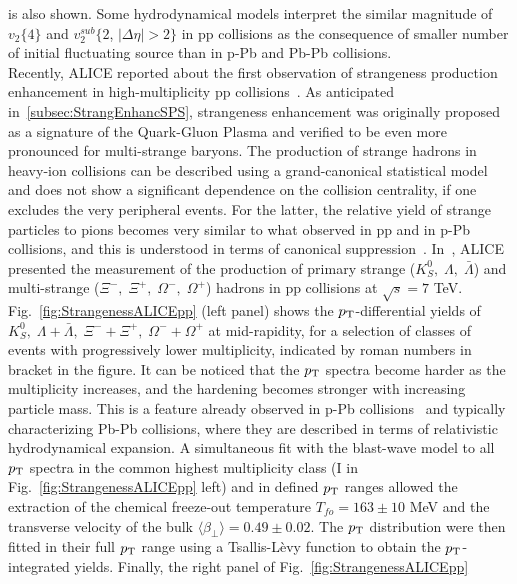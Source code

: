 is also shown. Some hydrodynamical models interpret the similar magnitude 
of $v_2 \{4\}$ and $v_2^{sub} \{2$, $|\Delta \eta| > 2\}$ in pp collisions as the 
consequence of smaller number of initial fluctuating source than in p-Pb and 
Pb-Pb collisions.\\
Recently, ALICE reported about the first observation of strangeness production
 enhancement in high-multiplicity pp collisions~\cite{ALICE:2017jyt}. As 
 anticipated in~\ref{subsec:StrangEnhancSPS}, strangeness enhancement 
 was originally proposed as a signature of the Quark-Gluon Plasma and 
 verified to be even more pronounced for multi-strange baryons. The production 
 of strange hadrons in heavy-ion collisions can be described using a 
 grand-canonical statistical model and does not show a significant dependence 
 on the collision centrality, if one excludes the very peripheral events. For the latter,
  the relative yield of strange particles to pions becomes very similar to what 
  observed in pp and in p-Pb~\cite{Abelev:2013haa,Adam:2015vsf} collisions, and this is understood
  in terms of canonical suppression~\cite{Tounsi:2001ck}. In~\cite{ALICE:2017jyt}, ALICE presented the
   measurement of the production of primary strange ($K^0_S,\; \Lambda,\; \bar{\Lambda}$) 
   and multi-strange ($\Xi^-,\; \Xi^+,\; \Omega^-,\; \Omega^+$) hadrons in pp 
   collisions at $\sqrt{s} = 7$ TeV. Fig.~\ref{fig:StrangenessALICEpp} (left panel) 
   shows the $p_{\rm T}$-differential yields of 
   $K^0_S,\; \Lambda + \bar{\Lambda},\; \Xi^- + \Xi^+,\; \Omega^- + \Omega^+$ 
   at mid-rapidity, for a selection of classes of events with progressively lower 
   multiplicity, indicated by roman numbers in bracket in the figure. It can be 
   noticed that the $p_{\rm T}$ spectra become harder as the multiplicity increases, 
   and the hardening becomes stronger with increasing particle mass. This is
    a feature already observed in p-Pb collisions~\cite{Abelev:2013haa} and 
    typically characterizing Pb-Pb collisions, where they are described in terms 
    of relativistic hydrodynamical expansion. A simultaneous fit with the 
    blast-wave model to all $p_{\rm T}$ spectra in the common highest multiplicity class 
    (I in Fig.~\ref{fig:StrangenessALICEpp} left) and in defined $p_{\rm T}$ ranges allowed the 
    extraction of the chemical freeze-out temperature $T_{fo} = 163 \pm 10$ 
    MeV and the transverse velocity of the bulk 
    $\langle \beta_{\perp} \rangle = 0.49 \pm 0.02$. The $p_{\rm T}$ distribution were
     then fitted in their full $p_{\rm T}$ range using a Tsallis-Lèvy function to obtain the 
     $p_{\rm T}$-integrated yields. Finally, the right panel of Fig.~\ref{fig:StrangenessALICEpp}
